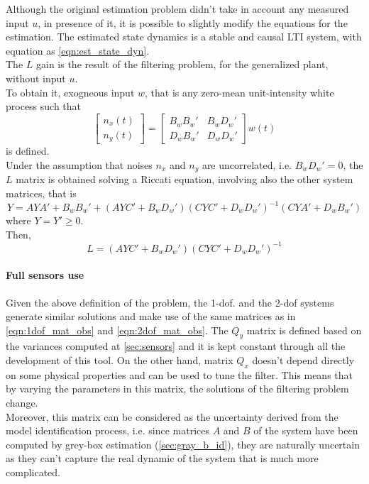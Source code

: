 Although the original estimation problem didn't take in account any measured input $u$, in presence of it, it is possible to slightly modify the equations for the estimation. 
The estimated state dynamics is a stable and causal LTI system, with equation as \cref{eqn:est_state_dyn}. \\
The $L$ gain is the result of the filtering problem, for the generalized plant, without input $u$. \\
To obtain it, exogneous input $w$, that is any zero-mean unit-intensity white process such that
\begin{equation}
	\begin{bmatrix}
		n_x(t) \\
		n_y(t)
	\end{bmatrix} = 
	\begin{bmatrix}
		B_wB_w'& B_wD_w'\\
		D_wB_w' & D_wD_w'
	\end{bmatrix} w(t)
\end{equation}
is defined. \\

Under the assumption that noises $n_x$ and $n_y$ are uncorrelated, i.e. $B_wD_w' = 0$, the $L$ matrix is obtained solving a Riccati equation, involving also the other system matrices, that is
\begin{equation}
	Y = AYA' + B_wB_w' + (AYC'+B_wD_w')(CYC'+D_wD_w')^{-1}(CYA'+D_wB_w')
	\label{eqn:riccati_kf}
\end{equation}
where $Y = Y' \geq 0$.\\
Then, 
\begin{equation}
	L = (AYC'+B_wD_w')(CYC'+D_wD_w')^{-1}
	\label{eqn:kf_gain}
\end{equation}

\paragraph{Full sensors use}
Given the above definition of the problem, the \acrshort{1-dof}. and the \acrshort{2-dof} systems generate similar solutions and make use of the same matrices as in \cref{eqn:1dof_mat_obs} and \cref{eqn:2dof_mat_obs}.
The $Q_y$ matrix is defined based on the variances computed at \cref{sec:sensors} and it is kept constant through all the development of this tool. 
On the other hand, matrix $Q_x$ doesn't depend directly on some physical properties and can be used to tune the filter. 
This means that by varying the parameters in this matrix, the solutions of the filtering problem change. \\
Moreover, this matrix can be considered as the uncertainty derived from the model identification process, i.e. since matrices $A$ and $B$ of the system have been computed by grey-box estimation (\cref{sec:gray_b_id}), they are naturally uncertain as they can't capture the real dynamic of the system that is much more complicated. \\

